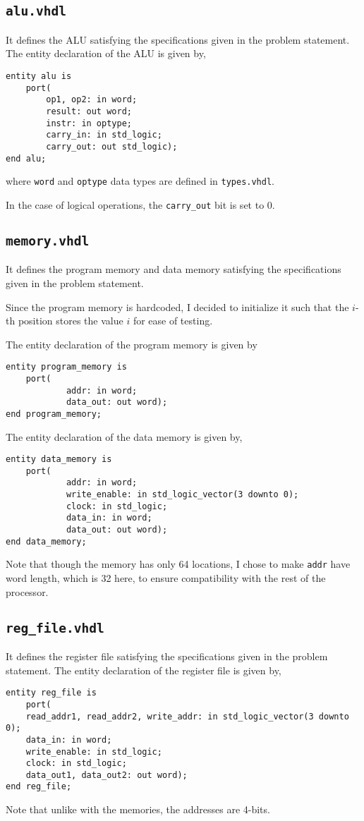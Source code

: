 \documentclass[a4paper]{scrartcl}
\renewcommand{\tt}{\texttt}
\begin{document}
\subsection*{\tt{alu.vhdl}}
It defines the ALU satisfying the specifications given in the problem statement.
The entity declaration of the ALU is given by,
\begin{verbatim}
entity alu is
	port(
		op1, op2: in word;
		result: out word;
		instr: in optype;
		carry_in: in std_logic;
		carry_out: out std_logic);
end alu;
\end{verbatim}
where \tt{word} and \tt{optype} data types are defined in \tt{types.vhdl}.

In the case of logical operations, the \tt{carry_out} bit is set to $0$.

\subsection*{\tt{memory.vhdl}}
It defines the program memory and data memory satisfying the specifications given in the problem statement.

Since the program memory is hardcoded, I decided to initialize it such that the $i$-th position stores the value $i$ for ease of testing.

The entity declaration of the program memory is given by
\begin{verbatim}
entity program_memory is
	port(
		    addr: in word;
		    data_out: out word);
end program_memory;
\end{verbatim}

The entity declaration of the data memory is given by,
\begin{verbatim}
entity data_memory is
	port(
		    addr: in word;
		    write_enable: in std_logic_vector(3 downto 0);
		    clock: in std_logic;
		    data_in: in word;
		    data_out: out word);
end data_memory;
\end{verbatim}

Note that though the memory has only 64 locations, I chose to make \tt{addr} have word length, which is 32 here, to ensure compatibility with the rest of the processor.

\subsection*{\tt{reg_file.vhdl}}
It defines the register file satisfying the specifications given in the problem statement.
The entity declaration of the register file is given by,
\begin{verbatim}
entity reg_file is
	port(
	read_addr1, read_addr2, write_addr: in std_logic_vector(3 downto 0);
	data_in: in word;
	write_enable: in std_logic;
	clock: in std_logic;
	data_out1, data_out2: out word);
end reg_file;
\end{verbatim}
Note that unlike with the memories, the addresses are 4-bits.
\end{document}

